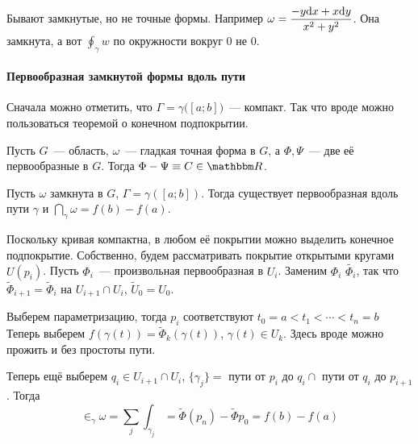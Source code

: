 \documentclass[12pt,timbord]{../../../notes}
\begin{document}
\begin{rem}
  Бывают замкнутые, но не точные формы. Например $\omega = \dfrac{-y \mathrm{d} x + x \mathrm{d} y}{x^2 +
  y^2}$. Она замкнута, а вот $\oint_\gamma w$ по окружности вокруг $0$ не 0.
\end{rem}

\paragraph{Первообразная замкнутой формы вдоль пути}
\label{par:lineint::closintpath}

Сначала можно отметить, что $\Gamma = \gamma\bigl([a;b]\bigr)$~--- компакт. Так что вроде можно
пользоваться теоремой о конечном подпокрытии.
\begin{lem}\label{thrm:lineint::closintpath::potdiff}
    Пусть $G$~--- область, $\omega$~--- гладкая точная форма в $G$, 
    а $\Phi, \Psi$~--- две её первообразные в $G$. Тогда $\Phi-\Psi\equiv C\in \R$.
\end{lem}

\begin{thrm}\label{thrm:lineint::closintpath}
  Пусть $\omega$ замкнута в $G$, $\Gamma=\gamma([a;b])$. Тогда существует первообразная вдоль пути
  $\gamma$ и  $\dint_\gamma \omega = f(b) - f(a)$.
\end{thrm}

\begin{ittproof}
  Поскольку кривая компактна, в любом её покрытии можно выделить конечное подпокрытие. Собственно,
  будем рассматривать покрытие открытыми кругами $U(p_i)$. Пусть $\Phi_i$~--- произвольная
  первообразная в $U_i$. Заменим $\Phi_i$ $\widetilde{\Phi_i}$, так что 
  $\widetilde{\Phi}_{i+1}= \widetilde{\Phi}_{i}$ на $U_{i+1} \cap U_i$, $\widetilde{U}_0=U_0$.

  Выберем параметризацию, тогда $p_i$  соответствуют $t_0=a< t_1 <\cdots < t_n = b$
  Теперь выберем $f(\gamma(t)) = \widetilde{\Phi}_k(\gamma(t))$, $\gamma(t) \in U_k$.
  Здесь вроде можно прожить и без простоты пути.

  Теперь ещё выберем $q_i \in U_{i+1} \cap U_i$, $\{\gamma_j\} =$ пути от $ p_i$ до $q_i \cap$
  пути от $q_i$ до $p_{i+1}$. Тогда
  \[
    \in _\gamma \omega = \sum_j\int_{\gamma_j} =  \widetilde{\Phi}(p_n) - \widetilde{\Phi}{p_0} =
    f(b) - f(a)
  \]
\end{ittproof}
\end{document}
